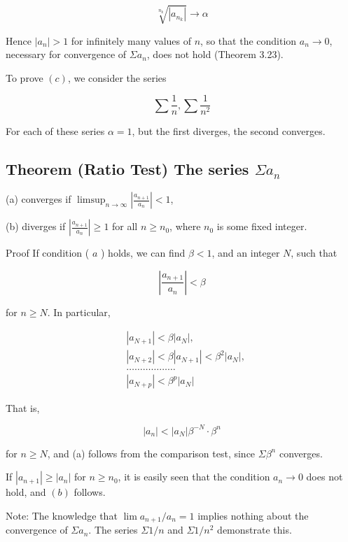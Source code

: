 \documentclass[10pt]{article}
\begin{document}
$$
\sqrt[n_{k}]{\left|a_{n_{k}}\right|} \rightarrow \alpha
$$

Hence $\left|a_{n}\right|>1$ for infinitely many values of $n$, so that the condition $a_{n} \rightarrow 0$, necessary for convergence of $\Sigma a_{n}$, does not hold (Theorem 3.23).

To prove $(c)$, we consider the series

$$
\sum \frac{1}{n}, \sum \frac{1}{n^{2}}
$$

For each of these series $\alpha=1$, but the first diverges, the second converges.

\subsection{Theorem (Ratio Test) The series $\Sigma a_{n}$}
(a) converges if $\limsup _{n \rightarrow \infty}\left|\frac{a_{n+1}}{a_{n}}\right|<1$,

(b) diverges if $\left|\frac{a_{n+1}}{a_{n}}\right| \geq 1$ for all $n \geq n_{0}$, where $n_{0}$ is some fixed integer.

Proof If condition ( $a$ ) holds, we can find $\beta<1$, and an integer $N$, such that

$$
\left|\frac{a_{n+1}}{a_{n}}\right|<\beta
$$

for $n \geq N$. In particular,

$$
\begin{aligned}
& \left|a_{N+1}\right|<\beta\left|a_{N}\right|, \\
& \left|a_{N+2}\right|<\beta\left|a_{N+1}\right|<\beta^{2}\left|a_{N}\right|, \\
& \ldots \ldots \ldots \ldots \ldots \ldots \\
& \left|a_{N+p}\right|<\beta^{p}\left|a_{N}\right|
\end{aligned}
$$

That is,

$$
\left|a_{n}\right|<\left|a_{N}\right| \beta^{-N} \cdot \beta^{n}
$$

for $n \geq N$, and (a) follows from the comparison test, since $\Sigma \beta^{n}$ converges.

If $\left|a_{n+1}\right| \geq\left|a_{n}\right|$ for $n \geq n_{0}$, it is easily seen that the condition $a_{n} \rightarrow 0$ does not hold, and $(b)$ follows.

Note: The knowledge that $\lim a_{n+1} / a_{n}=1$ implies nothing about the convergence of $\Sigma a_{n}$. The series $\Sigma 1 / n$ and $\Sigma 1 / n^{2}$ demonstrate this.
\end{document}
